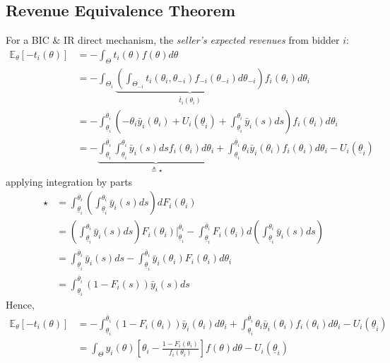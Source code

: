 \documentclass[11pt]{elegantbook_2}
\begin{document}
\subsection{Revenue Equivalence Theorem}
For a BIC $\&$ IR direct mechanism, the \textit{seller's expected revenues} from bidder $i$:
\begin{equation}
    \begin{aligned}
        \mathbb{E}_\theta[-t_i(\theta)]&=-\int_\Theta t_i(\theta)f(\theta) d\theta\\
        &=-\int_{\Theta_i} \underbrace{\left(\int_{\Theta_{-i}}t_i(\theta_i,\theta_{-i})f_{-i}(\theta_{-i})d\theta_{-i}\right)}_{\bar{t}_i(\theta_i)}f_i(\theta_i) d\theta_i\\
        &=-\int_{\underline{\theta}_i}^{\overline{\theta}_i}\left(-\theta_i \bar{y}_i(\theta_i)+U_i(\underline{\theta}_i)+\int_{\underline{\theta}_i}^{\theta_i}\bar{y}_i(s)ds\right)f_i(\theta_i) d\theta_i\\
        &=-\underbrace{\int_{\underline{\theta}_i}^{\overline{\theta}_i}\int_{\underline{\theta}_i}^{\theta_i}\bar{y}_i(s)dsf_i(\theta_i) d\theta_i}_{\triangleq \star}+\int_{\underline{\theta}_i}^{\overline{\theta}_i}\theta_i \bar{y}_i(\theta_i)f_i(\theta_i) d\theta_i-U_i(\underline{\theta}_i)
    \end{aligned}
    \nonumber
\end{equation}
applying integration by parts
\begin{equation}
    \begin{aligned}
        \star&=\int_{\underline{\theta}_i}^{\overline{\theta}_i}\left(\int_{\underline{\theta}_i}^{\theta_i}\bar{y}_i(s)ds\right)d F_i(\theta_i)\\
        &=\left(\int_{\underline{\theta}_i}^{\theta_i}\bar{y}_i(s)ds\right)F_i(\theta_i)\bigg|_{\underline{\theta}_i}^{\overline{\theta}_i}-\int_{\underline{\theta}_i}^{\overline{\theta}_i}F_i(\theta_i)d\left(\int_{\underline{\theta}_i}^{\theta_i}\bar{y}_i(s)ds\right)\\
        &=\int_{\underline{\theta}_i}^{\overline{\theta}_i}\bar{y}_i(s)ds-\int_{\underline{\theta}_i}^{\overline{\theta}_i}\bar{y}_i(\theta_i)F_i(\theta_i)d\theta_i\\
        &=\int_{\underline{\theta}_i}^{\overline{\theta}_i}(1-F_i(s))\bar{y}_i(s) ds
    \end{aligned}
    \nonumber
\end{equation}
Hence,
\begin{equation}
    \begin{aligned}
        \mathbb{E}_\theta[-t_i(\theta)]&=-\int_{\underline{\theta}_i}^{\overline{\theta}_i}(1-F_i(\theta_i))\bar{y}_i(\theta_i) d\theta_i+\int_{\underline{\theta}_i}^{\overline{\theta}_i}\theta_i \bar{y}_i(\theta_i)f_i(\theta_i) d\theta_i-U_i(\underline{\theta}_i)\\
        &=\int_\Theta y_i(\theta)\left[\theta_i-\frac{1-F_i(\theta_i)}{f_i(\theta_i)}\right]f(\theta)d\theta-U_i(\underline{\theta}_i)
    \end{aligned}
    \nonumber
\end{equation}
\end{document}
